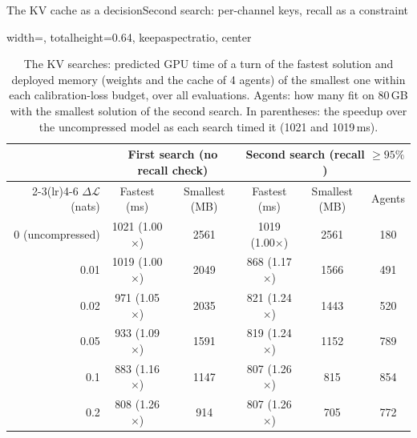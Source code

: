 \documentclass[aspectratio=169,10pt]{beamer}
\newcommand{\dloss}{\Delta\mathcal{L}}
\begin{document}
\begin{frame}{The KV cache as a decision}{Second search: per-channel keys, recall as a constraint}
\begin{table}
\centering
\begin{adjustbox}{width=\linewidth, totalheight=0.64\textheight, keepaspectratio, center}
\centering
\small
\begin{tabular}{rccccc}
\toprule
& \multicolumn{2}{c}{First search (no recall check)} & \multicolumn{3}{c}{Second search (recall $\ge95\%$)} \\
\cmidrule(lr){2-3}\cmidrule(lr){4-6}
$\dloss$ (nats) & Fastest (ms) & Smallest (MB) & Fastest (ms) & Smallest (MB) & Agents \\
\midrule
0 (uncompressed) & 1021 (1.00$\times$) & 2561 & 1019 (1.00$\times$) & 2561 & 180 \\
\midrule
0.01 & 1019 (1.00$\times$) & 2049 & 868 (1.17$\times$) & 1566 & 491 \\
0.02 & 971 (1.05$\times$) & 2035 & 821 (1.24$\times$) & 1443 & 520 \\
0.05 & 933 (1.09$\times$) & 1591 & 819 (1.24$\times$) & 1152 & 789 \\
0.1  & 883 (1.16$\times$) & 1147 & 807 (1.26$\times$) &  815 & 854 \\
0.2  & 808 (1.26$\times$) &  914 & 807 (1.26$\times$) &  705 & 772 \\
\bottomrule
\end{tabular}
\end{adjustbox}
\caption{The KV searches: predicted GPU time of a turn of the fastest solution and deployed memory (weights
and the cache of 4 agents) of the smallest one within each calibration-loss budget, over all evaluations.
Agents: how many fit on 80\,GB with the smallest solution of the second search. In parentheses: the speedup over the uncompressed model as each search timed it (1021 and 1019\,ms).}\label{tab:kv-limits}
\end{table}
\end{frame}
\end{document}
